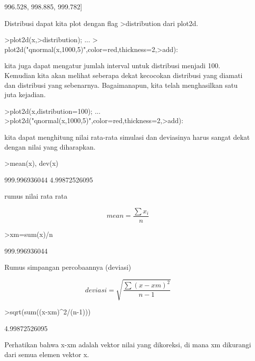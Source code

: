 \documentclass[a4paper,10pt]{article}
\begin{document}
\begin{eulernotebook}
\begin{eulercomment}
\begin{eulercomment}
\begin{euleroutput}
  996.528,  998.885,  999.782]
\end{euleroutput}
\begin{eulercomment}
Distribusi dapat kita plot dengan flag \textgreater{}distribution dari plot2d.
\end{eulercomment}
\begin{eulerprompt}
>plot2d(x,>distribution);  ...
> plot2d("qnormal(x,1000,5)",color=red,thickness=2,>add):
\end{eulerprompt}
\begin{eulercomment}
kita juga dapat mengatur jumlah interval untuk distribusi menjadi 100.
Kemudian kita akan melihat seberapa dekat kecocokan distribusi yang
diamati dan distribusi yang sebenarnya. Bagaimanapun, kita telah
menghasilkan satu juta kejadian.
\end{eulercomment}
\begin{eulerprompt}
>plot2d(x,distribution=100); ...
>plot2d("qnormal(x,1000,5)",color=red,thickness=2,>add):
\end{eulerprompt}
\begin{eulercomment}
kita dapat menghitung nilai rata-rata simulasi dan deviasinya harus
sangat dekat dengan nilai yang diharapkan.
\end{eulercomment}
\begin{eulerprompt}
>mean(x), dev(x)
\end{eulerprompt}
\begin{euleroutput}
  999.996936044
  4.99872526095
\end{euleroutput}
\begin{eulercomment}
rumus nilai rata rata

\end{eulercomment}
\begin{eulerformula}
\[
mean = \frac{\sum x_i}{n}
\]
\end{eulerformula}
\begin{eulerprompt}
>xm=sum(x)/n
\end{eulerprompt}
\begin{euleroutput}
  999.996936044
\end{euleroutput}
\begin{eulercomment}
Rumus simpangan percobaannya (deviasi)\\
\end{eulercomment}
\begin{eulerformula}
\[
deviasi= \sqrt{\frac{\sum (x - xm)^2}{n-1}}
\]
\end{eulerformula}
\begin{eulerprompt}
>sqrt(sum((x-xm)^2/(n-1)))
\end{eulerprompt}
\begin{euleroutput}
  4.99872526095
\end{euleroutput}
\begin{eulercomment}
Perhatikan bahwa x-xm adalah vektor nilai yang dikoreksi, di mana xm
dikurangi dari semua elemen vektor x.


\end{eulercomment}
\end{eulercomment}
\end{eulercomment}
\end{eulernotebook}
\end{document}
